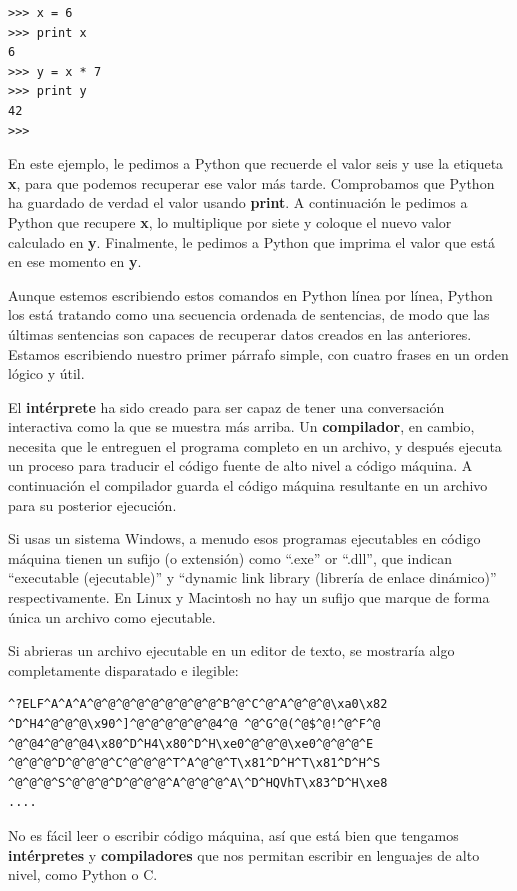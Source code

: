 \beforeverb
\begin{verbatim}
>>> x = 6
>>> print x
6
>>> y = x * 7
>>> print y
42
>>> 
\end{verbatim}
\afterverb
%
En este ejemplo, le pedimos a Python que recuerde el valor seis y use la etiqueta {\bf x},
para que podemos recuperar ese valor más tarde. Comprobamos que Python ha guardado de
verdad el valor usando {\bf print}. A continuación le pedimos a Python que recupere {\bf x},
lo multiplique por siete y coloque el nuevo valor calculado en {\bf y}.
Finalmente, le pedimos a Python que imprima el valor que está en ese momento en {\bf y}.

Aunque estemos escribiendo estos comandos en Python línea por línea, Python
los está tratando como una secuencia ordenada de sentencias, de modo
que las últimas sentencias son capaces de recuperar datos creados en las
anteriores. Estamos escribiendo nuestro primer párrafo simple, con cuatro frases
en un orden lógico y útil.

El {\bf intérprete} ha sido creado para ser capaz de tener una conversación interactiva como la que se muestra más arriba.
Un {\bf compilador}, en cambio, necesita que le entreguen el programa
completo en un archivo, y después
ejecuta un proceso para traducir el código fuente de alto nivel a código máquina.
A continuación el compilador guarda el código máquina resultante en un archivo para su
posterior ejecución. 

Si usas un sistema Windows, a menudo esos programas ejecutables en código máquina
tienen un sufijo (o extensión) como ``.exe'' or ``.dll'', que indican ``executable (ejecutable)'' y ``dynamic
link library (librería de enlace dinámico)'' respectivamente. En Linux y Macintosh
no hay un sufijo que marque de forma única un archivo como ejecutable.

Si abrieras un archivo ejecutable en un editor de texto, se mostraría algo
completamente disparatado e ilegible:

\beforeverb
\begin{verbatim}
^?ELF^A^A^A^@^@^@^@^@^@^@^@^@^B^@^C^@^A^@^@^@\xa0\x82
^D^H4^@^@^@\x90^]^@^@^@^@^@^@4^@ ^@^G^@(^@$^@!^@^F^@
^@^@4^@^@^@4\x80^D^H4\x80^D^H\xe0^@^@^@\xe0^@^@^@^E
^@^@^@^D^@^@^@^C^@^@^@^T^A^@^@^T\x81^D^H^T\x81^D^H^S
^@^@^@^S^@^@^@^D^@^@^@^A^@^@^@^A\^D^HQVhT\x83^D^H\xe8
....
\end{verbatim}
\afterverb
%
No es fácil leer o escribir código máquina, así que está bien que tengamos
{\bf intérpretes} y {\bf compiladores} que nos permitan escribir en lenguajes
de alto nivel, como Python o C.


